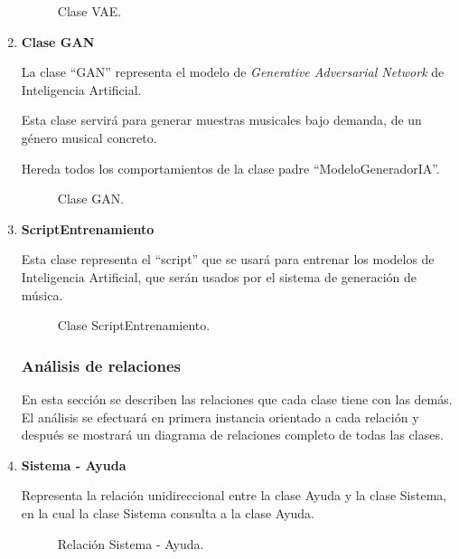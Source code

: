 \begin{enumerate}
  \begin{figure}[H]
    \centering
    
    \caption{Clase VAE.}
  \end{figure}

  \item \textbf{Clase GAN}

  La clase ``GAN'' representa el modelo de \emph{Generative Adversarial Network} de Inteligencia Artificial.

  Esta clase servirá para generar muestras musicales bajo demanda, de un género musical concreto.

  Hereda todos los comportamientos de la clase padre ``ModeloGeneradorIA''.

  \begin{figure}[H]
    \centering
    
    \caption{Clase GAN.}
  \end{figure}

  \item \textbf{ScriptEntrenamiento}

  Esta clase representa el ``script'' que se usará para entrenar los modelos de Inteligencia Artificial, que serán usados por el sistema de generación de música.

  \begin{figure}[H]
    \centering
    
    \caption{Clase ScriptEntrenamiento.}
  \end{figure}


  \subsubsection{Análisis de relaciones}

  En esta sección se describen las relaciones que cada clase tiene con las demás. El análisis se efectuará en primera instancia orientado a cada relación y después se mostrará un diagrama de relaciones completo de todas las clases.

  \item \textbf{Sistema - Ayuda}

  Representa la relación unidireccional entre la clase Ayuda y la
  clase Sistema, en la cual la clase Sistema consulta a la clase
  Ayuda.

  \begin{figure}[H]
    \centering
    
    \caption{Relación Sistema - Ayuda.}
  \end{figure}


\end{enumerate}
